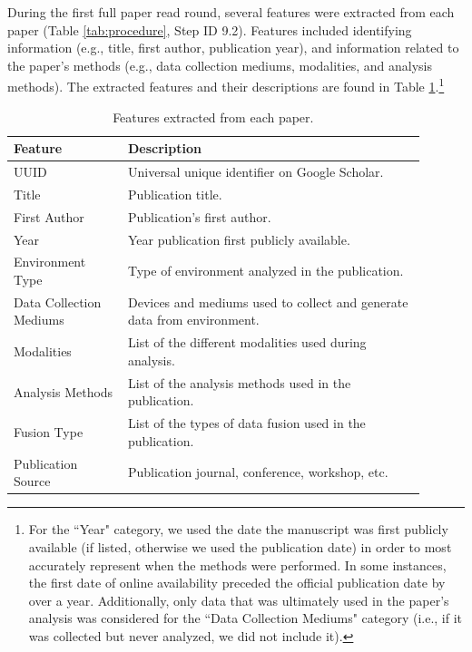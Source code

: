 \documentclass[manuscript,screen,review]{acmart}
\begin{document}
During the first full paper read round, several features were extracted from each paper (Table \ref{tab:procedure}, Step ID 9.2). Features included identifying information (e.g., title, first author, publication year), and information related to the paper's methods (e.g., data collection mediums, modalities, and analysis methods). The extracted features and their descriptions are found in Table \ref{tab:feature_extraction}.\footnote{For the ``Year" category, we used the date the manuscript was first publicly available (if listed, otherwise we used the publication date) in order to most accurately represent when the methods were performed. In some instances, the first date of online availability preceded the official publication date by over a year. Additionally, only data that was ultimately used in the paper's analysis was considered for the ``Data Collection Mediums" category (i.e., if it was collected but never analyzed, we did not include it).}

\begin{table}[htbp]
    \renewcommand{\arraystretch}{1.3}%
    \centering
    \caption{Features extracted from each paper.}
    \begin{tabular}{p{0.25\linewidth}@{\hskip .1in} | @{\hskip .1in}p{0.65\linewidth}@{\hskip .1in}}
        \toprule
        Feature & Description\\
        
        \toprule
        UUID & Universal unique identifier on Google Scholar.\\

        Title & Publication title. \\

        First Author & Publication's first author.\\

        Year & Year publication first publicly available.\\

        Environment Type & Type of environment analyzed in the publication.\\

        Data Collection Mediums & Devices and mediums used to collect and generate data from environment.\\

        Modalities & List of the different modalities used during analysis.\\

        Analysis Methods & List of the analysis methods used in the publication.\\

        Fusion Type & List of the types of data fusion used in the publication.\\

        Publication Source & Publication journal, conference, workshop, etc.\\
        
        \bottomrule
    \end{tabular}
    \label{tab:feature_extraction}
\end{table}
\end{document}
